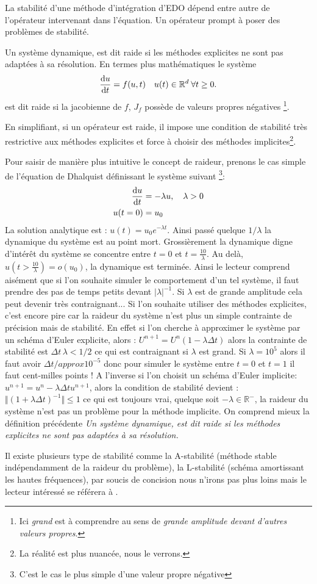 La stabilité d'une méthode d'intégration d'EDO dépend entre autre de l'opérateur intervenant dans l'équation.
Un opérateur prompt à poser des problèmes de stabilité.
\begin{definition}
    Un système dynamique, est dit raide si les méthodes explicites ne sont pas adaptées à sa résolution.
    En termes plus mathématiques le système 
    \begin{align}
    \frac{\text d u}{\text{d}t} = f(u,t) \quad u(t) \in \mathbb{R}^d \: \forall t\geq 0.
    \end{align}
    est dit raide si la jacobienne de $f$, $J_f$ possède de  valeurs propres négatives
    \footnote{Ici \textit{grand} est à comprendre au sens de \textit{grande amplitude devant d'autres valeurs propres}.}.
\end{definition}
En simplifiant, si un opérateur est raide, il impose une condition de stabilité très restrictive aux méthodes explicites et 
force à choisir des méthodes implicites\footnote{La réalité est plus nuancée, nous le verrons.}.
\begin{exemple}
    Pour saisir de manière plus intuitive le concept de raideur, prenons le cas simple de l'équation de Dhalquist définissant le système suivant
    \footnote{C'est le cas le plus simple d'une valeur propre négative}:
    \begin{align}
        \frac{\text d u }{\text d t} &= - \lambda u,\quad \lambda > 0\\\notag
        u(t=0)&=u_0
    \end{align}
    La solution analytique est : $u(t) = u_0 e^{-\lambda t}$. Ainsi passé quelque $ 1/\lambda$ la dynamique du système est au point mort. 
    Grossièrement la dynamique digne d'intérêt du système se concentre entre $t=0$ et $t=\frac{10}{\lambda}$. 
    Au delà, $u(t>\frac{10}{\lambda}) = o(u_0)$, la dynamique est terminée.
    Ainsi le lecteur comprend aisément que si l'on souhaite simuler le comportement d'un tel système, il faut prendre des pas de temps petits devant $\vert \lambda \vert^{-1}$.
    Si $\lambda$ est de grande amplitude cela peut devenir très contraignant... Si l'on souhaite utiliser des méthodes explicites, c'est encore pire car la raideur du système 
    n'est plus un simple contrainte de précision mais de stabilité. En effet si l'on cherche à approximer le système par un schéma d'Euler explicite, alors : 
    $U^{n+1} = U^n (1 - \lambda \Delta t)$ alors la contrainte de stabilité est $\Delta t \, \lambda < 1/2$ ce qui est contraignant si $\lambda$ est grand. 
    Si $\lambda = 10^5$ alors il faut avoir $\Delta t /approx 10^{-5}$ donc pour simuler le système entre $t=0$ et $t=1$ il faut cent-milles points !
    A l'inverse si l'on choisit un schéma d'Euler implicite: $u^{n+1} = u^n - \lambda \Delta t u^{n+1}$, alors la condition de stabilité devient : 
    $\Vert(1+\lambda \Delta t)^{-1}\Vert \leq 1$ ce qui est toujours vrai, quelque soit $- \lambda \in \mathbb{R}^-$, la raideur du système n'est pas un problème pour la méthode implicite.
    On comprend mieux la définition précédente \textit{Un système dynamique, est dit raide si les méthodes explicites ne sont pas adaptées à sa résolution.}
\end{exemple}
Il existe plusieurs type de stabilité comme la A-stabilité (méthode stable indépendamment de la raideur du problème), la L-stabilité (schéma amortissant les hautes fréquences),
par soucis de concision nous n'irons pas plus loins mais le lecteur intéressé se référera à \cite{HairerAndWanner1}.